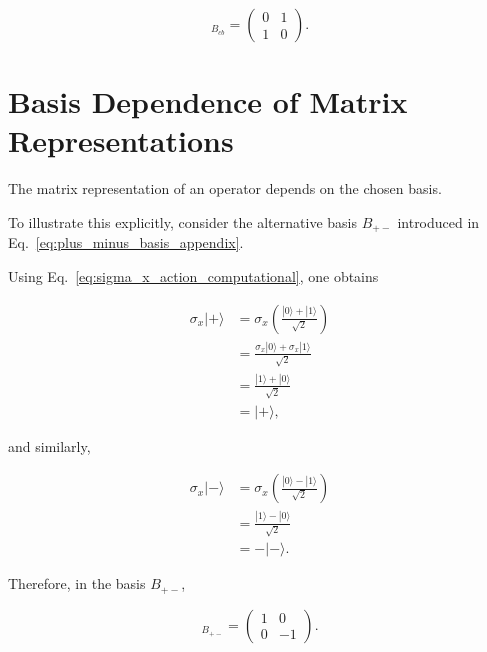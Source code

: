 \begin{equation}
[\sigma_x]_{B_{cb}}
=
\begin{pmatrix}
0 & 1 \\
1 & 0
\end{pmatrix}.
\label{eq:sigma_x_matrix_computational}
\end{equation}


\section*{Basis Dependence of Matrix Representations}

The matrix representation of an operator depends on the chosen basis.

To illustrate this explicitly, consider the alternative basis \( B_{+-} \) introduced in Eq.~\eqref{eq:plus_minus_basis_appendix}.

Using Eq.~\eqref{eq:sigma_x_action_computational}, one obtains

\begin{align}
\sigma_x |+\rangle
&=
\sigma_x
\left(
\frac{|0\rangle+|1\rangle}{\sqrt{2}}
\right)
\nonumber
\\
&=
\frac{
\sigma_x|0\rangle
+
\sigma_x|1\rangle
}{\sqrt{2}}
\nonumber
\\
&=
\frac{
|1\rangle+|0\rangle
}{\sqrt{2}}
\nonumber
\\
&=
|+\rangle,
\end{align}

and similarly,

\begin{align}
\sigma_x |-\rangle
&=
\sigma_x
\left(
\frac{|0\rangle-|1\rangle}{\sqrt{2}}
\right)
\nonumber
\\
&=
\frac{
|1\rangle-|0\rangle
}{\sqrt{2}}
\nonumber
\\
&=
-|-\rangle.
\end{align}

Therefore, in the basis \( B_{+-} \),

\begin{equation}
[\sigma_x]_{B_{+-}}
=
\begin{pmatrix}
1 & 0 \\
0 & -1
\end{pmatrix}.
\label{eq:sigma_x_matrix_plus_minus}
\end{equation}


